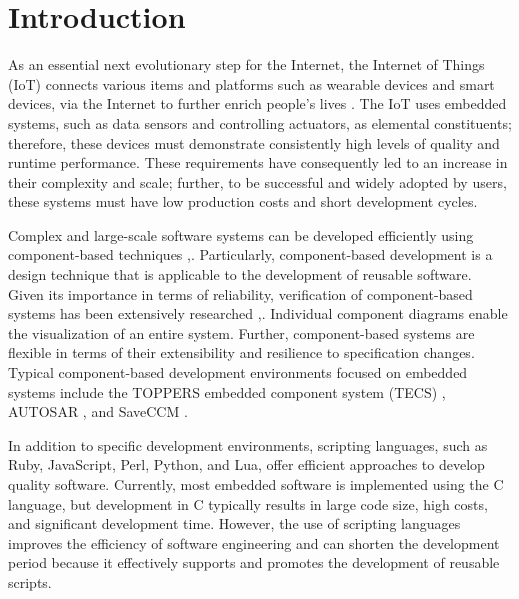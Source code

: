 \documentclass[JIP]{ipsj_v2/UTF8/ipsj}
\begin{document}
\maketitle

\section{Introduction}
\label{sec:Introduction}

As an essential next evolutionary step for the Internet, the Internet of Things (IoT) connects various items and platforms such as wearable devices and smart devices, via the Internet to further enrich people's lives \cite{par:IoTComputing}.
The IoT uses embedded systems, such as data sensors and controlling actuators, as elemental constituents; therefore, these devices must demonstrate consistently high levels of quality and runtime performance.
These requirements have consequently led to an increase in their complexity and scale; further, to be successful and widely adopted by users, these systems must have low production costs and short development cycles.

Complex and large-scale software systems can be developed efficiently using component-based techniques \cite{par:Crnkovic},\cite{par:CBD}.
Particularly, component-based development is a design technique that is applicable to the development of reusable software.
Given its importance in terms of reliability, verification of component-based systems has been extensively researched \cite{par:Blaming},\cite{par:Verification}.
Individual component diagrams enable the visualization of an entire system.
Further, component-based systems are flexible in terms of their extensibility and resilience to specification changes.
Typical component-based development environments focused on embedded systems include the TOPPERS embedded component system (TECS) \cite{par:TECS}, AUTOSAR \cite{url:AUTOSAR}, and SaveCCM \cite{par:SAVEapproach}.

In addition to specific development environments, scripting languages, such as Ruby, JavaScript, Perl, Python, and Lua, offer efficient approaches to develop quality software.
Currently, most embedded software is implemented using the C language, but development in C typically results in large code size, high costs, and significant development time.
However, the use of scripting languages improves the efficiency of software engineering and can shorten the development period because it effectively supports and promotes the development of reusable scripts.
\end{document}
